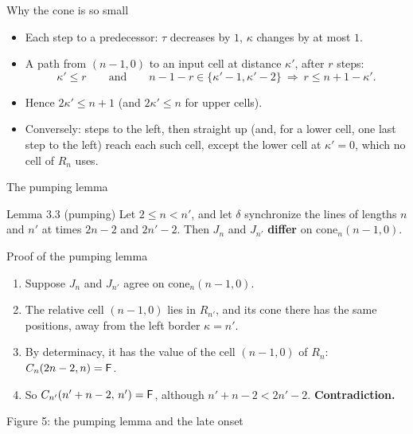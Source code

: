 \begin{frame}{Why the cone is so small}
\begin{itemize}
\item Each step to a predecessor: $\tau$ decreases by $1$, $\kappa$ changes by at most $1$.
\item A path from $(n-1,0)$ to an input cell at distance $\kappa'$, after $r$ steps:
\[\kappa'\le r\qquad\text{and}\qquad n-1-r\in\{\kappa'-1,\kappa'-2\}\ \Rightarrow\ r\le n+1-\kappa'.\]
\item Hence $2\kappa'\le n+1$ (and $2\kappa'\le n$ for upper cells).
\item Conversely: steps to the left, then straight up (and, for a lower cell, one last step to the left) reach each such cell, except the lower cell at $\kappa'=0$, which no cell of $R_n$ uses.
\end{itemize}
\end{frame}

\begin{frame}{The pumping lemma}
\vspace{2ex}
\begin{statement}{Lemma 3.3 (pumping)}
Let $2\le n<n'$, and let $\delta$ synchronize the lines of lengths $n$ and $n'$ at times $2n-2$ and $2n'-2$. Then $J_n$ and $J_{n'}$ \textbf{differ} on $\mathrm{cone}_n(n-1,0)$.
\end{statement}
\end{frame}

\begin{frame}{Proof of the pumping lemma}
\begin{enumerate}
\item Suppose $J_n$ and $J_{n'}$ agree on $\mathrm{cone}_n(n-1,0)$.
\item The relative cell $(n-1,0)$ lies in $R_{n'}$, and its cone there has the same positions, away from the left border $\kappa=n'$.
\item By determinacy, it has the value of the cell $(n-1,0)$ of $R_n$:\quad $C_n(2n-2,n)=\mathsf F$.
\item So $C_{n'}(n'+n-2,\,n')=\mathsf F$, although $n'+n-2<2n'-2$. \quad\textbf{Contradiction.}
\end{enumerate}
\end{frame}

\begin{frame}{Figure 5: the pumping lemma and the late onset}
\centering\fig[0.78]{}
\end{frame}

